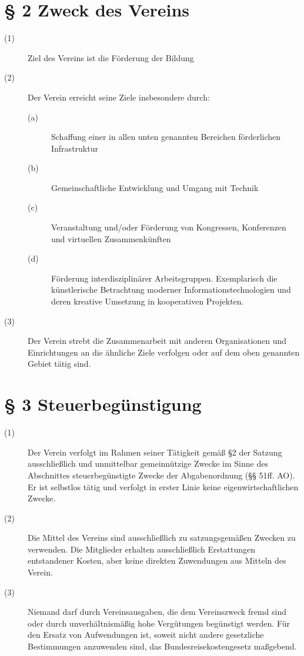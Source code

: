 \documentclass[a4paper,12pt]{scrartcl}
\begin{document}
\section*{\S{} 2 Zweck des Vereins}
\begin{description} 

\item[(1)] Ziel des Vereins ist die Förderung der Bildung
\item[(2)] Der Verein erreicht seine Ziele insbesondere durch:
\begin{description}
 \item[(a)] Schaffung einer in allen unten genannten Bereichen förderlichen Infrastruktur
 \item[(b)] Gemeinschaftliche Entwicklung und Umgang mit Technik
 \item[(c)] Veranstaltung und/oder Förderung von Kongressen, Konferenzen und virtuellen Zusammenkünften
 \item[(d)] Förderung interdisziplinärer Arbeitsgruppen. Exemplarisch die künstlerische Betrachtung moderner Informationstechnologien und deren kreative Umsetzung in kooperativen Projekten.
\end{description}
\item[(3)] Der Verein strebt die Zusammenarbeit mit anderen Organisationen und Einrichtungen an die ähnliche Ziele verfolgen oder auf dem oben genannten Gebiet tätig sind.
 
\end{description}



\section*{\S{} 3 Steuerbegünstigung}
\begin{description} 

\item[(1)] Der Verein verfolgt im Rahmen seiner Tätigkeit gemäß §2 der Satzung ausschließlich und unmittelbar gemeinnützige Zwecke im Sinne des Abschnittes steuerbegünstigte Zwecke der Abgabenordnung (§§ 51ff. AO). Er ist selbstlos tätig und verfolgt in erster Linie keine eigenwirtschaftlichen Zwecke.

\item[(2)] Die Mittel des Vereins sind ausschließlich zu satzungsgemäßen Zwecken zu verwenden. Die Mitglieder erhalten ausschließlich Erstattungen entstandener Kosten, aber keine direkten Zuwendungen aus Mitteln des Verein.

\item[(3)] Niemand darf durch Vereinsausgaben, die dem Vereinszweck fremd sind oder durch unverhältnismäßig hohe Vergütungen begünstigt werden. Für den Ersatz von Aufwendungen ist, soweit nicht andere gesetzliche Bestimmungen anzuwenden sind, das Bundesreisekostengesetz maßgebend.

\end{description}
\end{document}
